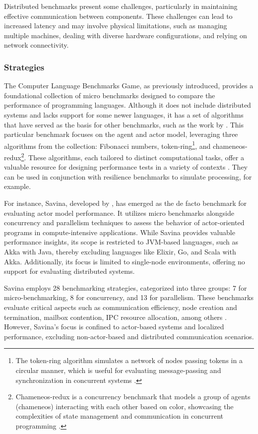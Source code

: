 Distributed benchmarks present some challenges, particularly in maintaining effective communication between components. These challenges can lead to increased latency and may involve physical limitations, such as managing multiple machines, dealing with diverse hardware configurations, and relying on network connectivity.

\subsubsection{Strategies}

The Computer Language Benchmarks Game, as previously introduced, provides a foundational collection of micro benchmarks designed to compare the performance of programming languages. Although it does not include distributed systems and lacks support for some newer languages, it has a set of algorithms that have served as the basis for other benchmarks, such as the work by \textcite{Cardoso2013}. This particular benchmark focuses on the agent and actor model, leveraging three algorithms from the collection: Fibonacci numbers, token-ring\footnote{The token-ring algorithm simulates a network of nodes passing tokens in a circular manner, which is useful for evaluating message-passing and synchronization in concurrent systems \cite{Cardoso2013}.}, and chameneos-redux\footnote{Chameneos-redux is a concurrency benchmark that models a group of agents (chameneos) interacting with each other based on color, showcasing the complexities of state management and communication in concurrent programming \cite{Cardoso2013}.}. These algorithms, each tailored to distinct computational tasks, offer a valuable resource for designing performance tests in a variety of contexts \cite{Cardoso2013,Randtoul2022}. They can be used in conjunction with resilience benchmarks to simulate processing, for example.

For instance, Savina, developed by \textcite{Imam2014}, has emerged as the de facto benchmark for evaluating actor model performance. It utilizes micro benchmarks alongside concurrency and parallelism techniques to assess the behavior of actor-oriented programs in compute-intensive applications. While Savina provides valuable performance insights, its scope is restricted to JVM-based languages, such as Akka with Java, thereby excluding languages like Elixir, Go, and Scala with Akka. Additionally, its focus is limited to single-node environments, offering no support for evaluating distributed systems.

Savina employs 28 benchmarking strategies, categorized into three groups: 7 for micro-benchmarking, 8 for concurrency, and 13 for parallelism. These benchmarks evaluate critical aspects such as communication efficiency, node creation and termination, mailbox contention, \gls{IPC} resource allocation, among others \cite{Imam2014,Blessing2019}. However, Savina’s focus is confined to actor-based systems and localized performance, excluding non-actor-based and distributed communication scenarios.


